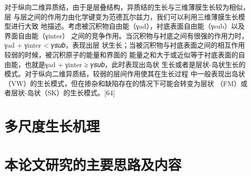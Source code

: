 对于纵向二维异质结，由于是层叠结构，异质结的生长与三维薄膜生长较为相似，层
与层之间的作用力由化学键变为范德瓦尔兹力，我们可以利用三维薄膜生长模型进行大致
地描述。考虑被沉积物自由能（γad），衬底表面自由能（γsub）以及界面自由能（γinter）
之间的竞争作用。当沉积物与衬底之间有很强的作用力时，γad + γinter < 𝛾𝑠𝑢𝑏，表现出层
状生长；当被沉积物与衬底表面之间的相互作用较弱的时候，被沉积原子的能量和界面的
能量之和大于或近似等于衬底表面的自由能，也就是γad + γinter ≥ 𝛾𝑠𝑢𝑏，此时表现出岛状
生长或者是层状-岛状生长的模式。对于纵向二维异质结，较弱的层间作用使其在生长过程
中一般表现出岛状（VW）的生长模式，但在掺杂和缺陷存在的情况下可能会转变为层状
（FM）或者层状-岛状（SK）的生长模式。[64]
\section{多尺度生长机理}%

\section{本论文研究的主要思路及内容}    